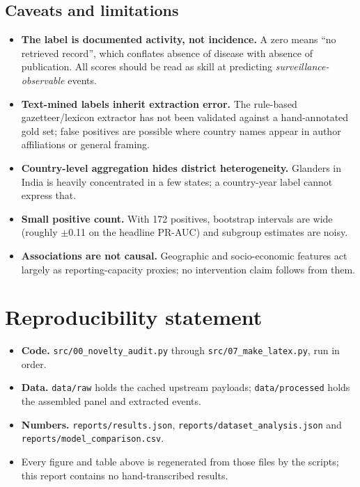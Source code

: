 \documentclass[11pt]{article}
\begin{document}
\subsection{Caveats and limitations}

\begin{itemize}
  \item \textbf{The label is documented activity, not incidence.} A zero means ``no retrieved
        record'', which conflates absence of disease with absence of publication. All scores should
        be read as skill at predicting \emph{surveillance-observable} events.
  \item \textbf{Text-mined labels inherit extraction error.} The rule-based gazetteer/lexicon
        extractor has not been validated against a hand-annotated gold set; false positives are
        possible where country names appear in author affiliations or general framing.
  \item \textbf{Country-level aggregation hides district heterogeneity.} Glanders in India is
        heavily concentrated in a few states; a country-year label cannot express that.
  \item \textbf{Small positive count.} With 172 positives, bootstrap intervals are
        wide (roughly $\pm$0.11 on the headline PR-AUC) and subgroup estimates are noisy.
  \item \textbf{Associations are not causal.} Geographic and socio-economic features act largely
        as reporting-capacity proxies; no intervention claim follows from them.
\end{itemize}

\section*{Reproducibility statement}

\begin{itemize}
  \item \textbf{Code.} \texttt{src/00\_novelty\_audit.py} through
        \texttt{src/07\_make\_latex.py}, run in order.
  \item \textbf{Data.} \texttt{data/raw} holds the cached upstream payloads;
        \texttt{data/processed} holds the assembled panel and extracted events.
  \item \textbf{Numbers.} \texttt{reports/results.json},
        \texttt{reports/dataset\_analysis.json} and
        \texttt{reports/model\_comparison.csv}.
  \item Every figure and table above is regenerated from those files by the scripts; this
        report contains no hand-transcribed results.
\end{itemize}
\end{document}

